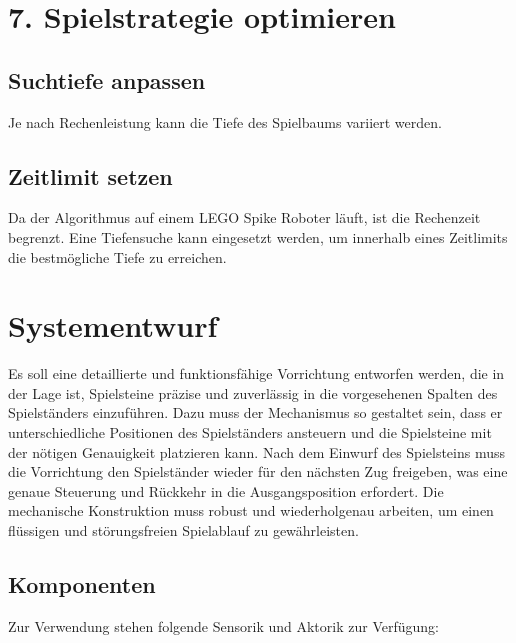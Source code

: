\section*{7. Spielstrategie optimieren}

\subsection*{Suchtiefe anpassen}
Je nach Rechenleistung kann die Tiefe des Spielbaums variiert werden. 

\subsection*{Zeitlimit setzen}
Da der Algorithmus auf einem LEGO Spike Roboter läuft, ist die Rechenzeit begrenzt. Eine Tiefensuche kann eingesetzt werden, um innerhalb eines Zeitlimits die bestmögliche Tiefe zu erreichen.







\section{Systementwurf}

Es soll eine detaillierte und funktionsfähige Vorrichtung entworfen werden, die in der Lage ist, Spielsteine präzise und zuverlässig in die vorgesehenen Spalten des Spielständers einzuführen. Dazu muss der Mechanismus so gestaltet sein, dass er unterschiedliche Positionen des Spielständers ansteuern und die Spielsteine mit der nötigen Genauigkeit platzieren kann. Nach dem Einwurf des Spielsteins muss die Vorrichtung den Spielständer wieder für den nächsten Zug freigeben, was eine genaue Steuerung und Rückkehr in die Ausgangsposition erfordert. Die mechanische Konstruktion muss robust und wiederholgenau arbeiten, um einen flüssigen und störungsfreien Spielablauf zu gewährleisten.


\subsection{Komponenten}
Zur Verwendung stehen folgende Sensorik und Aktorik zur Verfügung:


